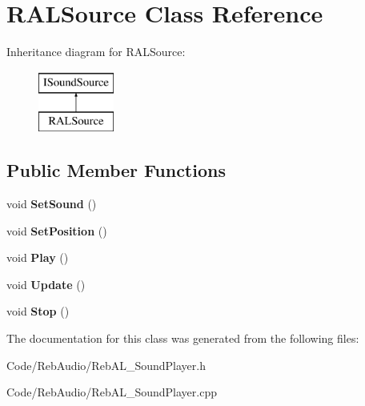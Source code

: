 \hypertarget{class_r_a_l_source}{}\section{R\+A\+L\+Source Class Reference}
\label{class_r_a_l_source}
Inheritance diagram for R\+A\+L\+Source\+:\begin{figure}[H]
\begin{center}
\leavevmode
\includegraphics[height=2.000000cm]{class_r_a_l_source}
\end{center}
\end{figure}
\subsection*{Public Member Functions}
\begin{DoxyCompactItemize}
\item 
void {\bfseries Set\+Sound} ()\hypertarget{class_r_a_l_source_a550b6129730c0084f62db9c97fdc1a7d}{}\label{class_r_a_l_source_a550b6129730c0084f62db9c97fdc1a7d}

\item 
void {\bfseries Set\+Position} ()\hypertarget{class_r_a_l_source_ad251b7ddb84d9b747d3482d459549e52}{}\label{class_r_a_l_source_ad251b7ddb84d9b747d3482d459549e52}

\item 
void {\bfseries Play} ()\hypertarget{class_r_a_l_source_a6ba71af866c62209072d998b543ccdf5}{}\label{class_r_a_l_source_a6ba71af866c62209072d998b543ccdf5}

\item 
void {\bfseries Update} ()\hypertarget{class_r_a_l_source_a4a035de1d51ff72bb75957baeb0b98f8}{}\label{class_r_a_l_source_a4a035de1d51ff72bb75957baeb0b98f8}

\item 
void {\bfseries Stop} ()\hypertarget{class_r_a_l_source_a989d0d5cf2e00fc077c3ce5aa6da89af}{}\label{class_r_a_l_source_a989d0d5cf2e00fc077c3ce5aa6da89af}

\end{DoxyCompactItemize}


The documentation for this class was generated from the following files\+:\begin{DoxyCompactItemize}
\item 
Code/\+Reb\+Audio/Reb\+A\+L\+\_\+\+Sound\+Player.\+h\item 
Code/\+Reb\+Audio/Reb\+A\+L\+\_\+\+Sound\+Player.\+cpp\end{DoxyCompactItemize}
